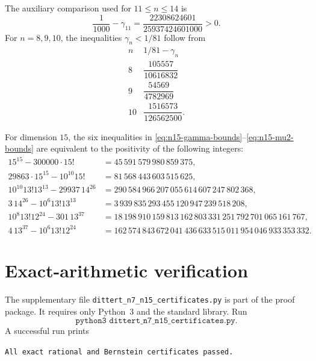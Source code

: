 \documentclass[11pt]{article}
\theoremstyle{definition}
\newcommand{\1}{\mathbf{1}}
\begin{document}
The auxiliary comparison used for $11\le n\le14$ is
\[
 \frac1{1000}-\gamma_{11}
 =\frac{22308624601}{25937424601000}>0.
 \tag{A.3}\label{eq:gamma11-small}
\]
For $n=8,9,10$, the inequalities $\gamma_n<1/81$ follow from
\[
\begin{array}{c|c}
 n&1/81-\gamma_n\\ \hline
 8&\dfrac{105557}{10616832}\\[2mm]
 9&\dfrac{54569}{4782969}\\[2mm]
 10&\dfrac{1516573}{126562500}.
\end{array}
\tag{A.4}\label{eq:gamma-low-small}
\]

For dimension $15$, the six inequalities in \eqref{eq:n15-gamma-bounds}--\eqref{eq:n15-mu2-bounds} are equivalent to the positivity of the following integers:
\[
\begin{aligned}
15^{15}-300000\cdot15!
 &=45\,591\,579\,980\,859\,375,\\
29863\cdot15^{15}-10^{10}15!
 &=81\,568\,443\,603\,515\,625,\\
10^{10}13!13^{13}-29937\,14^{26}
 &=290\,584\,966\,207\,055\,614\,607\,247\,802\,368,\\
3\,14^{26}-10^6 13!13^{13}
 &=3\,939\,835\,293\,455\,120\,947\,239\,518\,208,\\
10^8 13!12^{24}-301\,13^{37}
 &=18\,198\,910\,159\,813\,162\,803\,331\,251\,792\,701\,065\,161\,767,\\
4\,13^{37}-10^6 13!12^{24}
 &=162\,574\,843\,672\,041\,436\,633\,515\,011\,954\,046\,933\,353\,332.
\end{aligned}
\tag{A.5}\label{eq:n15-integers}
\]

\section{Exact-arithmetic verification}\label{app:code}

The supplementary file \texttt{dittert\_n7\_n15\_certificates.py} is part of
the proof package.  It requires only Python~3 and the standard library.  Run
\[
 \texttt{python3 dittert\_n7\_n15\_certificates.py}.
\]
A successful run prints
\begin{center}
\texttt{All exact rational and Bernstein certificates passed.}
\end{center}
\end{document}
